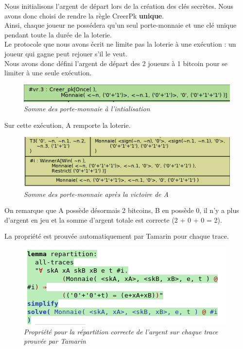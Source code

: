 \documentclass[conference]{IEEEtran}
\begin{document}
Nous initialisons l'argent de départ lors de la création des clés secrètes. Nous avons donc choisi de rendre la règle CreerPk \textbf{unique}. \\Ainsi, chaque joueur ne possédera qu'un seul porte-monnaie et une clé unique pendant toute la durée de la loterie.\\

Le protocole que nous avons écrit ne limite pas la loterie à une exécution : un joueur qui gagne peut rejouer s'il le veut. \\
Nous avons donc défini l'argent de départ des 2 joueurs à 1 bitcoin pour se limiter à une seule exécution.
    
    \begin{figure}[!h]
    \centering
    \includegraphics[scale=0.62]{Init.png}
    \caption{\textit{Somme des porte-monnaie à l'intialisation}}
    \label{fig:my_label}
\end{figure}

Sur cette exécution, A remporte la loterie.

\begin{figure}[!h]
    \centering
    \includegraphics[scale=0.55]{fin.png}
    \caption{\textit{Somme des porte-monnaie après la victoire de A}}
    \label{fig:my_label}
\end{figure}

On remarque que A possède désormais 2 bitcoins, B en possède 0, il n'y a plus d'argent en jeu et la somme d'argent totale est correcte (2 + 0 + 0 = 2). 

La propriété est prouvée automatiquement par Tamarin pour chaque trace. 

\begin{figure}[!h]
    \centering
    \includegraphics[scale=0.65]{repartition.png}
    \caption{\textit{Propriété pour la répartition correcte de l'argent sur chaque trace prouvée par Tamarin}}
    \label{fig:my_label}
\end{figure}
\end{document}
